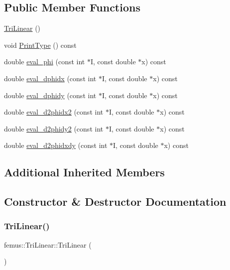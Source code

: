 \subsection*{Public Member Functions}
\begin{DoxyCompactItemize}
\item 
\mbox{\hyperlink{classfemus_1_1_tri_linear_abe2a2eabcc12c969d08be129f902c804}{Tri\+Linear}} ()
\item 
void \mbox{\hyperlink{classfemus_1_1_tri_linear_a1baabe41cae6c6d1e9e120b1b9869d2c}{Print\+Type}} () const
\item 
double \mbox{\hyperlink{classfemus_1_1_tri_linear_ac107e6f9e9f8e34961e40bf0610d54d1}{eval\+\_\+phi}} (const int $\ast$I, const double $\ast$x) const
\item 
double \mbox{\hyperlink{classfemus_1_1_tri_linear_a2cec2770fa07f3f4175b02368e8e7d6a}{eval\+\_\+dphidx}} (const int $\ast$I, const double $\ast$x) const
\item 
double \mbox{\hyperlink{classfemus_1_1_tri_linear_adca4bfeb974a52fe8b8dfc88561d0c4b}{eval\+\_\+dphidy}} (const int $\ast$I, const double $\ast$x) const
\item 
double \mbox{\hyperlink{classfemus_1_1_tri_linear_acdd74b2d1bf8e72765539fa6a6a2044d}{eval\+\_\+d2phidx2}} (const int $\ast$I, const double $\ast$x) const
\item 
double \mbox{\hyperlink{classfemus_1_1_tri_linear_a39bc9cfe4f0c5d994730b3202abc53c6}{eval\+\_\+d2phidy2}} (const int $\ast$I, const double $\ast$x) const
\item 
double \mbox{\hyperlink{classfemus_1_1_tri_linear_ae19bb78f1fd3b9b810d32f561a4bb666}{eval\+\_\+d2phidxdy}} (const int $\ast$I, const double $\ast$x) const
\end{DoxyCompactItemize}
\subsection*{Additional Inherited Members}


\subsection{Constructor \& Destructor Documentation}
\mbox{\label{classfemus_1_1_tri_linear_abe2a2eabcc12c969d08be129f902c804}} 
\subsubsection{\texorpdfstring{Tri\+Linear()}{TriLinear()}}
{\footnotesize\ttfamily femus\+::\+Tri\+Linear\+::\+Tri\+Linear (\begin{DoxyParamCaption}{ }\end{DoxyParamCaption})\hspace{0.3cm}{\ttfamily [inline]}}




